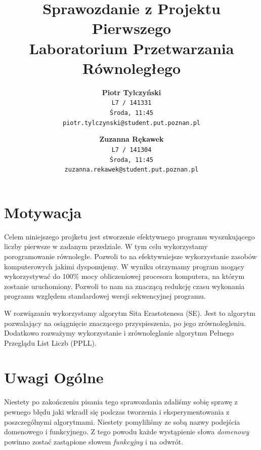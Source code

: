 \documentclass{article}
\begin{document}
    \title{
        Sprawozdanie z Projektu Pierwszego \\
        \small{Laboratorium Przetwarzania Równoległego}
    }
    \author{
        \textbf{Piotr Tylczyński}\\
        \texttt{L7 / 141331} \\
        \texttt{Środa, 11:45} \\
        \texttt{piotr.tylczynski@student.put.poznan.pl}
        \and
        \textbf{Zuzanna Rękawek}\\
        \texttt{L7 / 141304} \\
        \texttt{Środa, 11:45} \\
        \texttt{zuzanna.rekawek@student.put.poznan.pl}
        \date{}
        }
    \begin{titlepage}
        \maketitle
        \hfill \break
            
            
    \end{titlepage}
    
    \tableofcontents
    \pagebreak
    
    \section{Motywacja}
        Celem niniejszego projketu jest stworzenie efektywnego programu wyszukującego liczby pierwsze w zadanym przedziale. W tym celu wykorzystamy porogramowanie równoległe. Pozwoli to na efektywniejsze wykorzystanie zasobów komputerowych jakimi dysponujemy. W wyniku otrzymamy program mogący wykorzystywać do 100\% mocy obliczeniowej procesora komputera, na którym zostanie uruchomiony. Pozwoli to nam na znaczącą redukcję czasu wykonania programu względem standardowej wersji sekwencyjnej programu.
        
        W rozwiązaniu wykorzystamy algorytm Sita Erastotenesa (\gls{SE}). Jest to algorytm pozwalający na osiągnięcie znaczącego przyspieszenia, po jego zrównolegleniu. Dodatkowo rozważymy wykorzystanie i zrównoleglanie algorytmu Pełnego Przeglądu List Liczb (\gls{PPLL}).
        
    \section{Uwagi Ogólne}
        Niestety po zakończeniu pisania tego sprawozdania zdaliśmy sobię sprawę z pewnego błędu jaki wkradł się podczas tworzenia i eksperymentowania z poszczególnymi algorytmami. Niestety pomyliliśmy ze sobą nazwy podejścia domenowego i funkcyjnego. Z tego powodu każde wystąpienie słowa \emph{domenowy} powinno zostać zastąpione słowem \emph{funkcyjny} i na odwrót.
        
\end{document}
